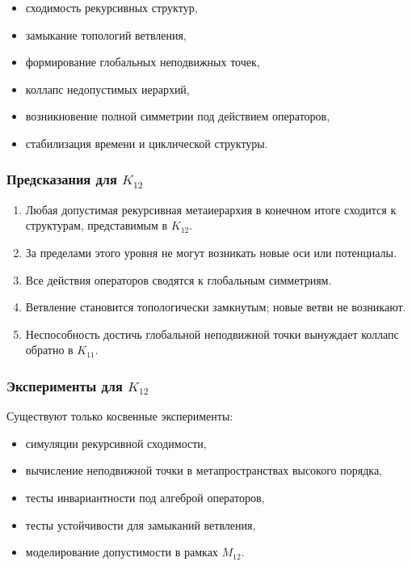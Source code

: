 \begin{itemize}
    \item сходимость рекурсивных структур,
    \item замыкание топологий ветвления,
    \item формирование глобальных неподвижных точек,
    \item коллапс недопустимых иерархий,
    \item возникновение полной симметрии под действием операторов,
    \item стабилизация времени и циклической структуры.
\end{itemize}

\subsubsection{Предсказания для $K_{12}$}

\begin{enumerate}
    \item Любая допустимая рекурсивная метаиерархия в конечном итоге
          сходится к структурам, представимым в $K_{12}$.
    \item За пределами этого уровня не могут возникать новые оси или
          потенциалы.
    \item Все действия операторов сводятся к глобальным симметриям.
    \item Ветвление становится топологически замкнутым; новые ветви не
          возникают.
    \item Неспособность достичь глобальной неподвижной точки вынуждает
          коллапс обратно в $K_{11}$.
\end{enumerate}

\subsubsection{Эксперименты для $K_{12}$}

Существуют только косвенные эксперименты:
\begin{itemize}
    \item симуляции рекурсивной сходимости,
    \item вычисление неподвижной точки в метапространствах высокого порядка,
    \item тесты инвариантности под алгеброй операторов,
    \item тесты устойчивости для замыканий ветвления,
    \item моделирование допустимости в рамках $M_{12}$.
\end{itemize}

